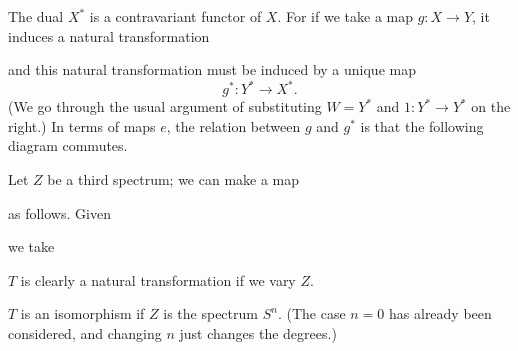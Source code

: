 \documentclass[../main]{subfiles}
\begin{document}
The dual $X^{\ast}$ is a contravariant functor of $X$. For if we take a map $g\colon X\longrightarrow Y$, it induces a natural transformation 

\begin{center}
\end{center}
and this natural transformation must be induced by a unique map $$g^{\ast}\colon Y^{\ast}\longrightarrow X^{\ast}.$$(We go through the usual argument of substituting $W=Y^{\ast}$ and $1\colon Y^{\ast}\longrightarrow Y^{\ast}$ on the right.) In terms of maps $e$, the relation between $g$ and $g^{\ast}$ is that the following diagram commutes.

\begin{center}
\end{center}
Let $Z$ be a third spectrum; we can make a map
\begin{center}
\end{center}
as follows. Given
\begin{center}
\end{center}
we take
\begin{center}
\end{center}
$T$ is clearly a natural transformation if we vary $Z$.

\begin{remark}
\label{rmk:p3ch05.1}
$T$ is an isomorphism if $Z$ is the spectrum $S^n$. (The case $n=0$ has already been considered, and changing $n$ just changes the degrees.)
\end{remark}
\end{document}
